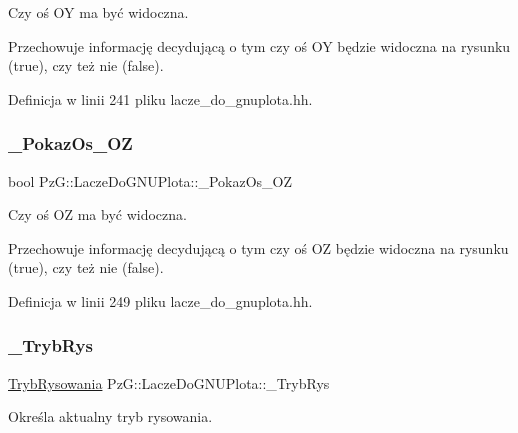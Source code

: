 Czy oś OY ma być widoczna. 

Przechowuje informację decydującą o tym czy oś OY będzie widoczna na rysunku ({\ttfamily true}), czy też nie ({\ttfamily false}). 

Definicja w linii 241 pliku lacze\+\_\+do\+\_\+gnuplota.\+hh.

\mbox{\label{class_pz_g_1_1_lacze_do_g_n_u_plota_a5b0afc06dc248790d2e7475b2162e309}} 
\subsubsection{\texorpdfstring{\+\_\+\+Pokaz\+Os\+\_\+\+OZ}{\_PokazOs\_OZ}}
{\footnotesize\ttfamily bool Pz\+G\+::\+Lacze\+Do\+G\+N\+U\+Plota\+::\+\_\+\+Pokaz\+Os\+\_\+\+OZ\hspace{0.3cm}{\ttfamily [protected]}}



Czy oś OZ ma być widoczna. 

Przechowuje informację decydującą o tym czy oś OZ będzie widoczna na rysunku ({\ttfamily true}), czy też nie ({\ttfamily false}). 

Definicja w linii 249 pliku lacze\+\_\+do\+\_\+gnuplota.\+hh.

\mbox{\label{class_pz_g_1_1_lacze_do_g_n_u_plota_a00e3a51bb47d3fb26eee875dc48215db}} 
\subsubsection{\texorpdfstring{\+\_\+\+Tryb\+Rys}{\_TrybRys}}
{\footnotesize\ttfamily \hyperlink{namespace_pz_g_aeedae1ef10c66d720f9e89de408ca4ca}{Tryb\+Rysowania} Pz\+G\+::\+Lacze\+Do\+G\+N\+U\+Plota\+::\+\_\+\+Tryb\+Rys\hspace{0.3cm}{\ttfamily [protected]}}



Określa aktualny tryb rysowania. 

